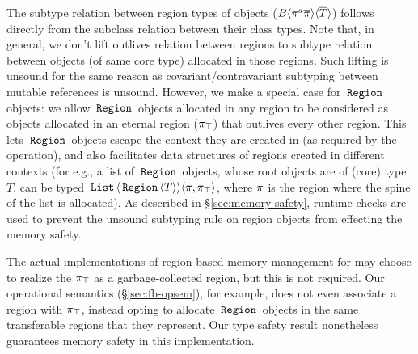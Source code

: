 The subtype relation between region types of objects
($B\langle \pi^a\overline{\pi} \rangle\langle \overline{T} \rangle$) follows directly from the
subclass relation between their class types. Note that, in general, we
don't lift outlives relation between regions to subtype relation
between objects (of same core type) allocated in those regions. Such
lifting is unsound for the same reason as covariant/contravariant
subtyping between mutable references is unsound. However, we make a
special case for $\,{\tt Region}\,$ objects: we allow $\,{\tt Region}\,$ objects allocated
in any region to be considered as objects allocated in an eternal
region ($\pi_{\top}$) that outlives every other region. This lets $\,{\tt Region}\,$
objects escape the context they are created in (as required by the
 operation), and also facilitates data structures of
regions created in different contexts (for e.g., a list of $\,{\tt Region}\,$
objects, whose root objects are of (core) type $T$, can be typed
$\,{\tt List}\,\langle \,{\tt Region}\,\langle T \rangle \rangle\langle \pi,\pi_{\top} \rangle$, where $\pi$ is
the region where the spine of the list is allocated). As described in
\S\ref{sec:memory-safety}, runtime checks are used to prevent the
unsound subtyping rule on region objects from effecting the memory safety.

The actual implementations of region-based memory management for \name
may choose to realize the $\pi_{\top}$ as a garbage-collected region, but
this is not required. Our operational semantics
(\S\ref{sec:fb-opsem}), for example, does not even associate a region
with $\pi_{\top}$, instead opting to allocate $\,{\tt Region}\,$ objects in the same
transferable regions that they represent. Our type safety result
nonetheless guarantees memory safety in this implementation.


